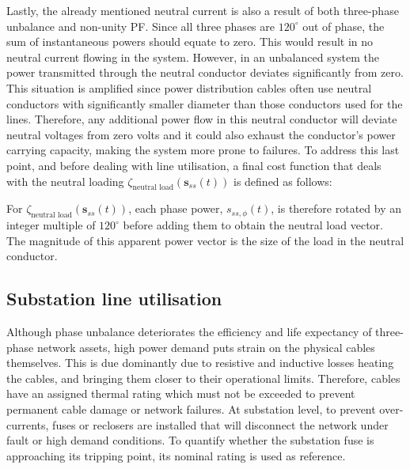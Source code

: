 
Lastly, the already mentioned neutral current is also a result of both three-phase unbalance and non-unity PF.
Since all three phases are $120^\circ$ out of phase, the sum of instantaneous powers should equate to zero.
This would result in no neutral current flowing in the system.
However, in an unbalanced system the power transmitted through the neutral conductor deviates significantly from zero.
This situation is amplified since power distribution cables often use neutral conductors with significantly smaller diameter than those conductors used for the lines.
Therefore, any additional power flow in this neutral conductor will deviate neutral voltages from zero volts and it could also exhaust the conductor's power carrying capacity, making the system more prone to failures.
To address this last point, and before dealing with line utilisation, a final cost function that deals with the neutral loading $\zeta_\text{neutral load}(\textbf{s}_{ss}(t))$ is defined as follows:



For $\zeta_\text{neutral load}(\textbf{s}_{ss}(t))$, each phase power, $s_{ss,\phi}(t)$, is therefore rotated by an integer multiple of $120^\circ$ before adding them to obtain the neutral load vector.
The magnitude of this apparent power vector is the size of the load in the neutral conductor.

\subsection{Substation line utilisation}
\label{ch1:subsec:substation-line-utilisation}

Although phase unbalance deteriorates the efficiency and life expectancy of three-phase network assets, high power demand puts strain on the physical cables themselves.
This is due dominantly due to resistive and inductive losses heating the cables, and bringing them closer to their operational limits.
Therefore, cables have an assigned thermal rating which must not be exceeded to prevent permanent cable damage or network failures.
At substation level, to prevent over-currents, fuses or reclosers are installed that will disconnect the network under fault or high demand conditions.
To quantify whether the substation fuse is approaching its tripping point, its nominal rating is used as reference.

